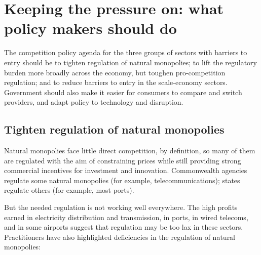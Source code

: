 \chapter{Keeping the pressure on: what policy makers should do \label{chap:policy}}




The competition policy agenda for the three groups of sectors with barriers to entry should be to tighten regulation of natural monopolies; to lift the regulatory burden more broadly across the economy, but toughen pro-competition regulation; and to reduce barriers to entry in the scale-economy sectors. Government should also make it easier for consumers to compare and switch providers, and adapt policy to technology and disruption.


\section{Tighten regulation of natural monopolies}

Natural monopolies face little direct competition, by definition, so many of them are regulated with the aim of constraining prices while still providing strong commercial incentives for investment and innovation. Commonwealth agencies regulate some natural monopolies (for example, telecommunications); states regulate others (for example, most ports). 

But the needed regulation is not working well everywhere. The high profits earned in electricity distribution and transmission, in ports, in wired telecoms, and in some airports suggest that regulation may be too lax in these sectors. Practitioners have also highlighted deficiencies in the regulation of natural monopolies:

